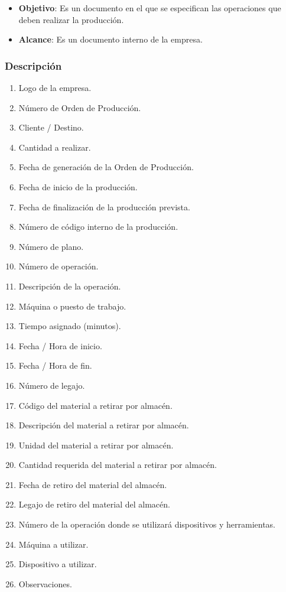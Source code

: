 \pagebreak
\begin{itemize}
 \item \textbf{Objetivo}: Es un documento en el que se especifican las operaciones que deben realizar la producci\'on.
 \item \textbf{Alcance}: Es un documento interno de la empresa.
\end{itemize}

\subsubsection{Descripción}
\begin{enumerate}
 \item Logo de la empresa.
 \item Número de Orden de Producci\'on.
 \item Cliente / Destino.
 \item Cantidad a realizar.
 \item Fecha de generaci\'on de la Orden de Producci\'on.
 \item Fecha de inicio de la producción.
 \item Fecha de finalización de la producción prevista.
 \item N\'umero de código interno de la producci\'on.
 \item N\'umero de plano.
 \item N\'umero de operaci\'on.
 \item Descripci\'on de la operaci\'on.
 \item M\'aquina o puesto de trabajo.
 \item Tiempo asignado (minutos).
 \item Fecha / Hora de inicio.
 \item Fecha / Hora de fin.
 \item N\'umero de legajo.
 \item C\'odigo del material a retirar por almac\'en.
 \item Descripci\'on del material a retirar por almac\'en.
 \item Unidad del material a retirar por almac\'en.
 \item Cantidad requerida del material a retirar por almac\'en.
 \item Fecha de retiro del material del almac\'en.
 \item Legajo de retiro del material del almac\'en.
 \item N\'umero de la operaci\'on donde se utilizar\'a dispositivos y herramientas.
 \item M\'aquina a utilizar.
 \item Dispositivo a utilizar.
 \item Observaciones.
\end{enumerate}

